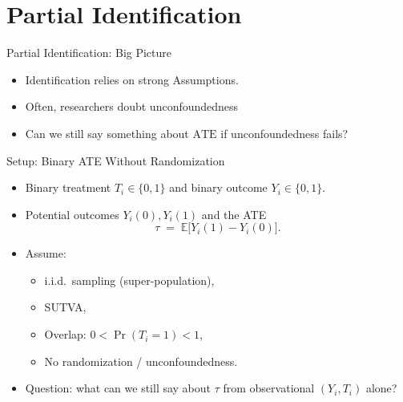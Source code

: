 \documentclass[10pt]{beamer}
\theoremstyle{plain}
\newcommand{\ATE}{\mathrm{ATE}}
\begin{document}
\section{Partial Identification}

\begin{frame}{Partial Identification: Big Picture}
  \begin{itemize}
    \item Identification relies on strong Assumptions.
    \vspace{0.5cm}
    \item Often, researchers doubt unconfoundedness
    \vspace{0.5cm}
    \item Can we still say something about $\ATE$ if unconfoundedness fails?
  \end{itemize}
\end{frame}

\begin{frame}{Setup: Binary ATE Without Randomization}
  \begin{itemize}
    \item Binary treatment $T_i \in \{0,1\}$ and binary outcome $Y_i \in \{0,1\}$.
    \item Potential outcomes $Y_i(0), Y_i(1)$ and the ATE
    \[
      \tau \;=\; \mathbb{E}\bigl[ Y_i(1) - Y_i(0) \bigr].
    \]
    \pause
    \item Assume:
    \begin{itemize}
      \item i.i.d.\ sampling (super-population),
      \item SUTVA,
      \item Overlap: $0 < \Pr(T_i = 1) < 1$,
      \item \alert{No} randomization / unconfoundedness.
    \end{itemize}
    \pause
    \item Question: what can we still say about $\tau$ from observational $(Y_i,T_i)$ alone?
  \end{itemize}
\end{frame}
\end{document}
